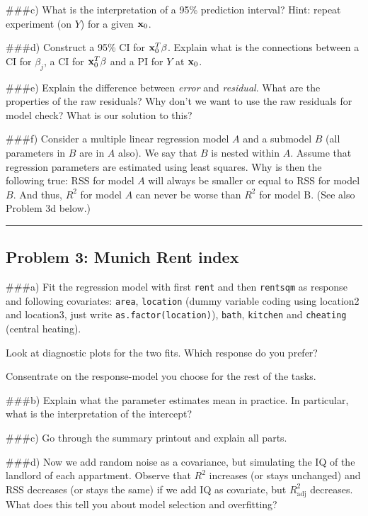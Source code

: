 \documentclass[]{article}
\begin{document}
\#\#\#c) What is the interpretation of a 95\% prediction interval? Hint:
repeat experiment (on \(Y\)) for a given \({\bf x}_0\).

\#\#\#d) Construct a 95\% CI for \({\bf x}_0^T \beta\). Explain what is
the connections between a CI for \(\beta_j\), a CI for
\({\bf x}_0^T \beta\) and a PI for \(Y\) at \({\bf x}_0\).

\#\#\#e) Explain the difference between \emph{error} and
\emph{residual}. What are the properties of the raw residuals? Why don't
we want to use the raw residuals for model check? What is our solution
to this?

\#\#\#f) Consider a multiple linear regression model \(A\) and a
submodel \(B\) (all parameters in \(B\) are in \(A\) also). We say that
\(B\) is nested within \(A\). Assume that regression parameters are
estimated using least squares. Why is then the following true: RSS for
model \(A\) will always be smaller or equal to RSS for model \(B\). And
thus, \(R^2\) for model \(A\) can never be worse than \(R^2\) for model
B. (See also Problem 3d below.)

\begin{center}\rule{0.5\linewidth}{\linethickness}\end{center}

\hypertarget{problem-3-munich-rent-index}{%
\subsection{Problem 3: Munich Rent
index}\label{problem-3-munich-rent-index}}

\#\#\#a) Fit the regression model with first \texttt{rent} and then
\texttt{rentsqm} as response and following covariates: \texttt{area},
\texttt{location} (dummy variable coding using location2 and location3,
just write \texttt{as.factor(location)}), \texttt{bath},
\texttt{kitchen} and \texttt{cheating} (central heating).

Look at diagnostic plots for the two fits. Which response do you prefer?

Consentrate on the response-model you choose for the rest of the tasks.

\#\#\#b) Explain what the parameter estimates mean in practice. In
particular, what is the interpretation of the intercept?

\#\#\#c) Go through the summary printout and explain all parts.

\#\#\#d) Now we add random noise as a covariance, but simulating the IQ
of the landlord of each appartment. Observe that \(R^2\) increases (or
stays unchanged) and RSS decreases (or stays the same) if we add IQ as
covariate, but \(R^2_{\text{adj}}\) decreases. What does this tell you
about model selection and overfitting?
\end{document}
